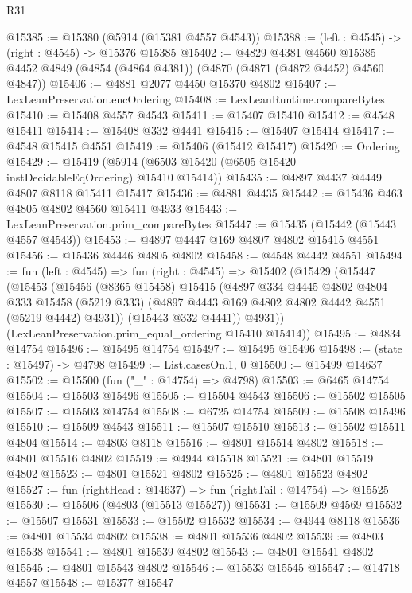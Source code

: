 \begin{lexlean}{R31}
\begin{coremodule}
@15385 := @15380 (@5914 (@15381 @4557 @4543))
@15388 := (left : @4545) -> (right : @4545) -> @15376 @15385
@15402 := @4829
    @4381
    @4560
    @15385
    @4452
    @4849
    (@4854 (@4864 @4381))
    (@4870 (@4871 (@4872 @4452) @4560 @4847))
@15406 := @4881 @2077 @4450 @15370 @4802
@15407 := LexLeanPreservation.encOrdering
@15408 := LexLeanRuntime.compareBytes
@15410 := @15408 @4557 @4543
@15411 := @15407 @15410
@15412 := @4548 @15411
@15414 := @15408 @332 @4441
@15415 := @15407 @15414
@15417 := @4548 @15415 @4551
@15419 := @15406 (@15412 @15417)
@15420 := Ordering
@15429 := @15419 (@5914 (@6503 @15420 (@6505 @15420 instDecidableEqOrdering) @15410 @15414))
@15435 := @4897 @4437 @4449 @4807 @8118 @15411 @15417
@15436 := @4881 @4435
@15442 := @15436 @463 @4805 @4802 @4560 @15411 @4933
@15443 := LexLeanPreservation.prim_compareBytes
@15447 := @15435 (@15442 (@15443 @4557 @4543))
@15453 := @4897 @4447 @169 @4807 @4802 @15415 @4551
@15456 := @15436 @4446 @4805 @4802
@15458 := @4548 @4442 @4551
@15494 := fun (left : @4545) =>
  fun (right : @4545) =>
  @15402
    (@15429
      (@15447
        (@15453
          (@15456
            (@8365 @15458)
            @15415
            (@4897
              @334
              @4445
              @4802
              @4804
              @333
              @15458
              (@5219 @333)
              (@4897 @4443 @169 @4802 @4802 @4442 @4551 (@5219 @4442) @4931))
            (@15443 @332 @4441))
          @4931))
      (LexLeanPreservation.prim_equal_ordering @15410 @15414))
@15495 := @4834 @14754
@15496 := @15495 @14754
@15497 := @15495 @15496
@15498 := (state : @15497) -> @4798
@15499 := List.casesOn.{1, 0}
@15500 := @15499 @14637
@15502 := @15500 (fun ("_" : @14754) => @4798)
@15503 := @6465 @14754
@15504 := @15503 @15496
@15505 := @15504 @4543
@15506 := @15502 @15505
@15507 := @15503 @14754
@15508 := @6725 @14754
@15509 := @15508 @15496
@15510 := @15509 @4543
@15511 := @15507 @15510
@15513 := @15502 @15511 @4804
@15514 := @4803 @8118
@15516 := @4801 @15514 @4802
@15518 := @4801 @15516 @4802
@15519 := @4944 @15518
@15521 := @4801 @15519 @4802
@15523 := @4801 @15521 @4802
@15525 := @4801 @15523 @4802
@15527 := fun (rightHead : @14637) => fun (rightTail : @14754) => @15525
@15530 := @15506 (@4803 (@15513 @15527))
@15531 := @15509 @4569
@15532 := @15507 @15531
@15533 := @15502 @15532
@15534 := @4944 @8118
@15536 := @4801 @15534 @4802
@15538 := @4801 @15536 @4802
@15539 := @4803 @15538
@15541 := @4801 @15539 @4802
@15543 := @4801 @15541 @4802
@15545 := @4801 @15543 @4802
@15546 := @15533 @15545
@15547 := @14718 @4557
@15548 := @15377 @15547

\end{coremodule}
\end{lexlean}
